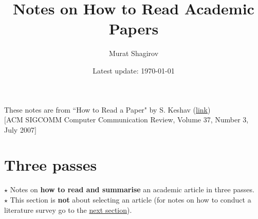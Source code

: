 \documentclass[a4paper]{article}
\title{Notes on How to Read Academic Papers}
\author{Murat Shagirov}
\date{Latest update: \today}
\begin{document}
\maketitle

These notes are from ``How to Read a Paper" by S. Keshav (\href{http://ccr.sigcomm.org/online/files/p83-keshavA.pdf}{link})\\
$[$ACM SIGCOMM Computer Communication Review, Volume 37, Number 3, July 2007$]$

\section{Three passes}
\label{sec:1}
$\star$ Notes on \textbf{how to read and summarise} an academic article in three passes.\\
$\star$ This section is \textbf{not} about selecting an article (for notes on how to conduct a literature survey go to the \hyperref[sec:2]{next section}).\\
\end{document}
